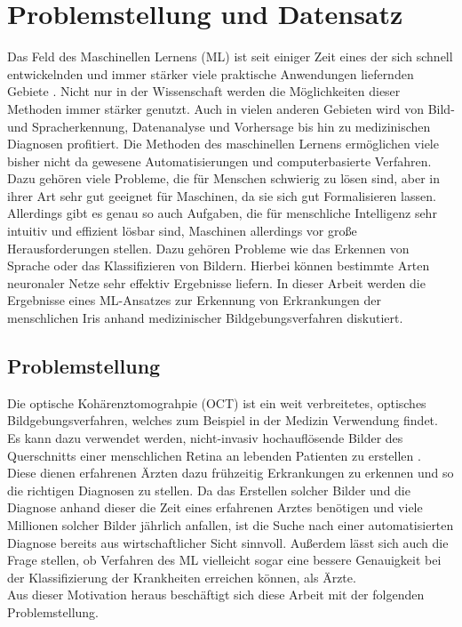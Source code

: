 {\let\clearpage\relax \chapter{Problemstellung und Datensatz}}

Das Feld des Maschinellen Lernens (ML) ist seit einiger Zeit eines der sich
schnell entwickelnden und immer stärker viele praktische Anwendungen liefernden
Gebiete \cite{goodfellow}. Nicht nur in der Wissenschaft werden die Möglichkeiten dieser Methoden
immer stärker genutzt. Auch in vielen anderen Gebieten wird von Bild- und
Spracherkennung, Datenanalyse und Vorhersage bis hin zu medizinischen Diagnosen
profitiert. Die Methoden des maschinellen Lernens ermöglichen viele bisher nicht
da gewesene Automatisierungen und computerbasierte Verfahren. \\
Dazu gehören viele Probleme, die für Menschen schwierig zu lösen sind, aber in
ihrer Art sehr gut geeignet für Maschinen, da sie sich gut Formalisieren lassen.
Allerdings gibt es genau so auch Aufgaben, die für menschliche Intelligenz sehr
intuitiv und effizient lösbar sind, Maschinen allerdings vor große
Herausforderungen stellen. Dazu gehören Probleme wie das Erkennen von Sprache
oder das Klassifizieren von Bildern.
Hierbei können bestimmte Arten neuronaler Netze sehr effektiv Ergebnisse
liefern.
In dieser Arbeit werden die Ergebnisse eines ML-Ansatzes zur Erkennung von
Erkrankungen der menschlichen Iris anhand medizinischer Bildgebungsverfahren
diskutiert.

\section{Problemstellung}

Die optische Kohärenztomograhpie (OCT) ist ein weit verbreitetes, optisches
Bildgebungsverfahren, welches zum Beispiel in der Medizin Verwendung
findet. Es kann dazu verwendet werden, nicht-invasiv hochauflösende
Bilder des Querschnitts einer menschlichen Retina an lebenden Patienten
zu erstellen \cite{paper}.\\
Diese dienen erfahrenen Ärzten dazu frühzeitig Erkrankungen zu erkennen
und so die richtigen Diagnosen zu stellen. Da das Erstellen solcher Bilder
und die Diagnose anhand dieser die Zeit eines erfahrenen Arztes benötigen
und viele Millionen solcher Bilder jährlich anfallen, ist die Suche nach
einer automatisierten Diagnose bereits aus wirtschaftlicher Sicht sinnvoll.
Außerdem lässt sich auch die Frage stellen, ob Verfahren des ML vielleicht
sogar eine bessere Genauigkeit bei der Klassifizierung der Krankheiten erreichen
können, als Ärzte.\\
Aus dieser Motivation heraus beschäftigt sich diese Arbeit mit der folgenden
Problemstellung.\\
\newline
\noindent{}\\

